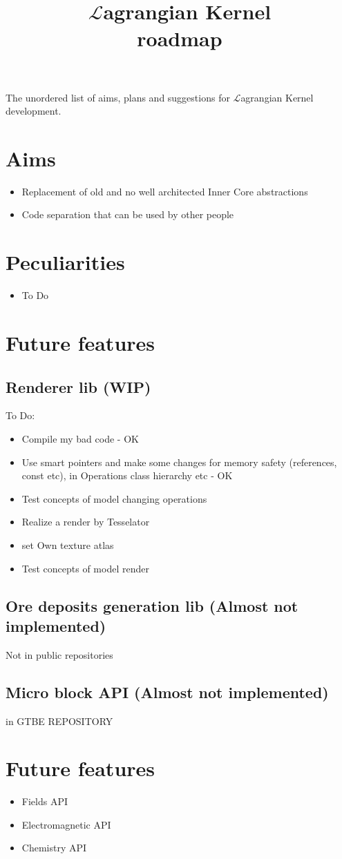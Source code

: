 \documentclass[12pt]{article}
\title{$\mathcal{L}$agrangian Kernel \\ roadmap}
\begin{document}
	\maketitle

	The unordered list of aims, plans and suggestions for $\mathcal{L}$agrangian Kernel development.

	\section{Aims}
	\begin{itemize}
		\item Replacement of old and no well architected Inner Core abstractions 
		\item Code separation that can be used by other people
	\end{itemize}

	\section{Peculiarities}

	\begin{itemize}
		\item To Do
	\end{itemize}

	\section{Future features}

	\subsection{Renderer lib (WIP)}
	To Do:

	\begin{itemize}
		\item Compile my bad code - OK
		\item Use smart pointers and make some changes for memory safety (references, const etc), in Operations class hierarchy etc - OK
		\item Test concepts of model changing operations
		\item Realize a render by Tesselator
		\item set Own texture atlas
		\item Test concepts of model render
	\end{itemize}
	
	\subsection{Ore deposits generation lib (Almost not implemented)} 
	
	Not in public repositories

	\subsection{Micro block API (Almost not implemented)} 
	
	in GTBE REPOSITORY

	\section{Future features}

	\begin{itemize}
		\item Fields API
		\item Electromagnetic API
		\item Chemistry API
	\end{itemize}
\end{document}
